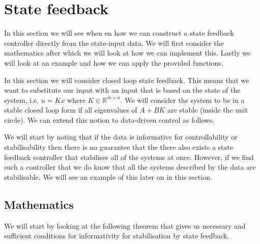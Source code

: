 \section{State feedback}
In this section we will see when en how we can construct a state feedback controller directly from the state-input data. We will first consider the mathematics after which we will look at how we can implement this. Lastly we will look at an example and how we can apply the provided functions.

In this section we will consider closed loop state feedback. This means that we want to substitute our input with an input that is based on the state of the system, i.e. $u = K x$ where $K \in \mathbb{R}^{m\times n}$. We will consider the system to be in a stable closed loop form if all eigenvalues of $A + B K$ are stable (inside the unit circle). We can extend this notion to data-driven control as follows.


We will start by noting that if the data is informative for controllability or stabilisability then there is no guarantee that the there also exists a state feedback controller that stabilises all of the systems at once. However, if we find such a controller that we do know that all the systems described by the data are stabilisable. We will see an example of this later on in this section.

\subsection{Mathematics}
We will start by looking at the following theorem that gives us necessary and sufficient conditions for informativity for stabilisation by state feedback.


